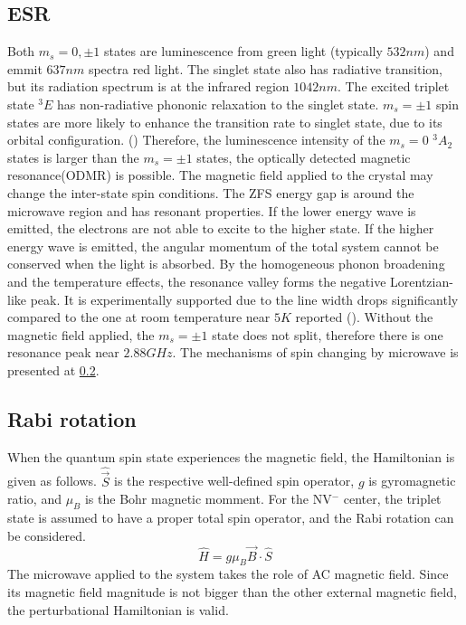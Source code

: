 \documentclass{article}
\begin{document}
\subsection{ESR}
Both $m_s = 0, \pm 1$ states are luminescence from green light (typically $532nm$) and emmit $637nm$ spectra red light.
The singlet state also has radiative transition, but its radiation spectrum is at the infrared region $1042nm$.
The excited triplet state $ ^3E$ has non-radiative phononic relaxation to the singlet state.
$m_s = \pm 1$ spin states are more likely to enhance the transition rate to singlet state, due to its orbital configuration. (\cite{preference})
Therefore, the luminescence intensity of the $m_s = 0$ $ ^3A_2$ states is larger than the $m_s = \pm 1$ states, the optically detected magnetic resonance(ODMR) is possible.
The magnetic field applied to the crystal may change the inter-state spin conditions.
The ZFS energy gap is around the microwave region and has resonant properties.
If the lower energy wave is emitted, the electrons are not able to excite to the higher state.
If the higher energy wave is emitted, the angular momentum of the total system cannot be conserved when the light is absorbed.
By the homogeneous phonon broadening and the temperature effects, the resonance valley forms the negative Lorentzian-like peak.
It is experimentally supported due to the line width drops significantly compared to the one at room temperature near $5K$ reported (\cite{lowtemp}).
Without the magnetic field applied, the $m_s = \pm 1$ state does not split, therefore there is one resonance peak near $2.88GHz$.
The mechanisms of spin changing by microwave is presented at \ref{section: Rabi}.

\subsection{Rabi rotation}
\label{section: Rabi}
When the quantum spin state experiences the magnetic field, the Hamiltonian is given as follows.
$\hat{\vec{S}}$ is the respective well-defined spin operator, $g$ is gyromagnetic ratio, and $\mu_B$ is the Bohr magnetic momment.
For the NV$ ^-$ center, the triplet state is assumed to have a proper total spin operator, and the Rabi rotation can be considered.
\begin{equation}
    \hat{H} = g\mu_B \vec{B} \cdot \hat{S}
\end{equation}
The microwave applied to the system takes the role of AC magnetic field.
Since its magnetic field magnitude is not bigger than the other external magnetic field, the perturbational Hamiltonian is valid.
\end{document}
